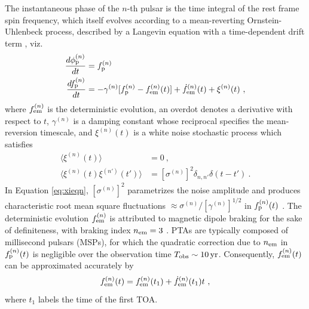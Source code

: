 \documentclass[fleqn,usenatbib,useAMS]{mnras}
\begin{document}
The instantaneous phase of the $n$-th pulsar is the time integral of the rest frame spin frequency, which itself evolves according to a mean-reverting Ornstein-Uhlenbeck process, described by a Langevin equation with a time-dependent drift term \citep{Vargas}, viz.
\begin{align}
	\frac{d \phi_{\rm p}^{(n)}}{dt} &= f_{\rm p}^{(n)} 	\label{eq:phi_evolution} \\ 
	\frac{df_{\rm p}^{(n)}}{dt} &= -\gamma^{(n)}	 [f_{\rm p}^{(n)} - f_{\rm em}^{(n)} (t)] + \dot{f}_{\rm em}^{(n)}(t) +\xi^{(n)}(t) \ , 
	\label{eq:frequency_evolution}
\end{align}
where $f_{\rm em}^{(n)}$ is the deterministic evolution, an overdot denotes a derivative with respect to $t$, $\gamma^{(n)}$ is a damping constant whose reciprocal specifies the mean-reversion timescale, and $\xi^{(n)}(t)$ is a white noise stochastic process which satisfies
\begin{align}
	\langle \xi^{(n)}(t) \rangle &= 0 \ , \\
	\langle \xi^{(n)}(t) \xi^{(n')}(t') \rangle &= [\sigma^{(n)}]^2 \delta_{n,n'} \delta(t - t') \ .	\label{eq:xieqn}
\end{align}
In Equation \eqref{eq:xieqn}, $[\sigma^{(n)}]^2$ parametrizes the noise amplitude and produces characteristic root mean square fluctuations $\approx \sigma^{(n)} / [\gamma^{(n)}]^{1/2}$ in $f_{\rm p}^{(n)}(t)$ \citep{gardiner2009stochastic}. The deterministic evolution $f_{\rm em}^{(n)}$ is attributed to magnetic dipole braking for the sake of definiteness, with braking index $n_{\rm em}=3$ \citep{1969ApJ...157..869G}. PTAs are typically composed of millisecond pulsars (MSPs), for which the quadratic correction due to $n_{\rm em}$ in $f_{\rm p}^{(n)}(t)$ is negligible over the observation time $T_{\rm obs} \sim 10 \, {\rm yr}$. Consequently, 	$f_{\rm em}^{(n)}(t)$ can be approximated accurately by 
\begin{equation}
	f_{\rm em}^{(n)}(t) = f_{\rm em}^{(n)}(t_1) + \dot{f}_{\rm em}^{(n)}(t_1)t \ , \label{eq:spinevol}
\end{equation} 
where $t_1$ labels the time of the first TOA. \newline 
\end{document}
